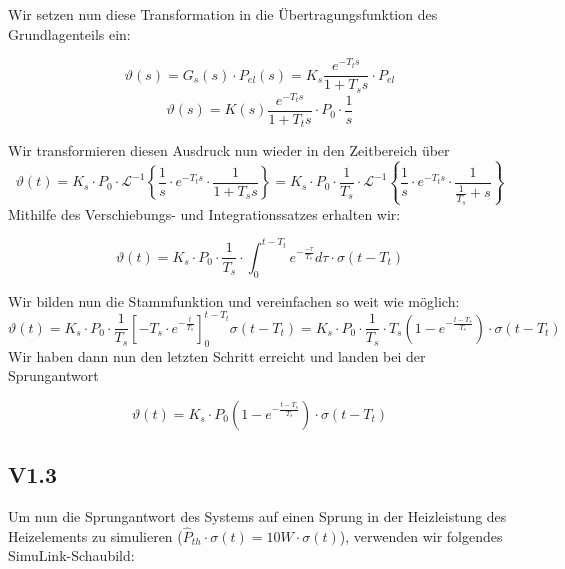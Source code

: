\documentclass{report}
\begin{document}
Wir setzen nun diese Transformation in die Übertragungsfunktion des Grundlagenteils ein:

\begin{equation}
  \label{eq:4}
  \vartheta(s) = G_{s}(s)\cdot P_{el}(s) = K_{s}\frac{e^{-T_{t}s}}{1+T_{s}s}\cdot P_{el}
\end{equation}
\begin{equation}
  \label{eq:5}
  \vartheta(s) = K(s)\frac{e^{-T_{t}s}}{1+T_{t}s}\cdot P_{0} \cdot \frac{1}{s}
\end{equation}

Wir transformieren diesen Ausdruck nun wieder in den Zeitbereich über
\begin{equation}
  \label{eq:6}
  \vartheta(t) = K_{s} \cdot P_{0}\cdot \mathcal{L}^{-1}\left\{\frac{1}{s}\cdot e^{-T_{t}s}\cdot\frac{1}{1+T_{s}s}\right\} = K_{s} \cdot P_{0} \cdot \frac{1}{T_{s}} \cdot \mathcal{L}^{-1}\left\{\frac{1}{s}\cdot e^{-T_{t}s}\cdot \frac{1}{\frac{1}{T_{s}}+s}\right\}
\end{equation}
Mithilfe des Verschiebungs- und Integrationssatzes erhalten wir:

\begin{equation}
  \label{eq:7}
  \vartheta(t) = K_{s}\cdot P_{0}\cdot \frac{1}{T_{s}}\cdot \int_{0}^{t-T_{t}}e^{-\frac{-\tau}{T_{s}}}d\tau \cdot \sigma(t-T_{t})
\end{equation}

Wir bilden nun die Stammfunktion und vereinfachen so weit wie möglich:
\begin{equation}
  \label{eq:8}
  \vartheta(t) = K_{s}\cdot P_{0} \cdot \frac{1}{T_{s}} \left[-T_{s}\cdot e^{-\frac{t}{T_{s}}}\right]_{0}^{t-T_{t}}\sigma(t-T_{t}) = K_{s}\cdot P_{0} \cdot \frac{1}{T_{s}} \cdot T_{s} \left(1-e^{-\frac{t-T_{s}}{T_{s}}}\right) \cdot \sigma(t-T_{t})
\end{equation}
Wir haben dann nun den letzten Schritt erreicht und landen bei der Sprungantwort

\begin{equation}
  \label{eq:9}
  \vartheta(t) = K_{s}\cdot P_{0} \left(1-e^{-\frac{t-T_{s}}{T_{s}}}\right)\cdot \sigma(t-T_{t})
\end{equation}

\newpage

\subsection{V1.3}

Um nun die Sprungantwort des Systems auf einen Sprung in der Heizleistung des Heizelements zu simulieren ($\hat{P}_{th} \cdot \sigma(t) = 10W \cdot \sigma(t)$), verwenden wir folgendes SimuLink-Schaubild:
\end{document}
